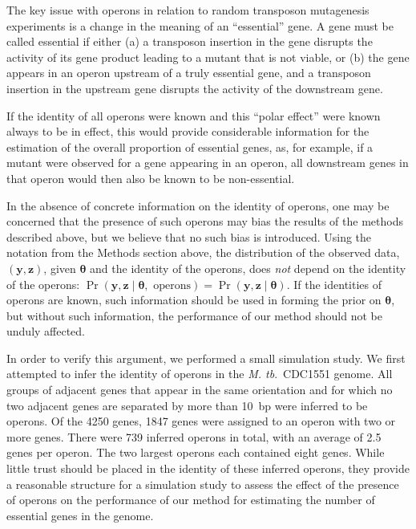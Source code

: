 \documentclass[letterpaper]{article}
\begin{document}
\begin{multicols}{2}
The key issue with operons in relation to random transposon
mutagenesis experiments is a change in the meaning of an ``essential''
gene.  A gene must be called essential if either (a) a transposon
insertion in the gene disrupts the activity of its gene product
leading to a mutant that is not viable, or (b) the gene appears in
an operon upstream of a truly essential gene, and a transposon
insertion in the upstream gene disrupts the activity of the
downstream gene. 

If the identity of all operons were known and this ``polar effect''
were known always to be in effect, this would provide considerable
information for the estimation of the overall proportion of essential
genes, as, for example, if a mutant were observed for a gene appearing
in an operon, all downstream genes in that operon would then also be
known to be non-essential.

In the absence of concrete information on the identity of operons, one
may be concerned that the presence of such operons may bias the
results of the methods described above, but we believe that no such
bias is introduced.  Using the notation from the Methods section
above, the distribution of the observed data, $(\boldsymbol{y},
\boldsymbol{z})$, given $\boldsymbol{\theta}$ and the identity of the
operons, does \emph{not} depend on the identity of the operons:
$\Pr(\boldsymbol{y}, \boldsymbol{z} \; | \; \boldsymbol{\theta},
\text{ operons}) = \Pr(\boldsymbol{y}, \boldsymbol{z} \; | \;
\boldsymbol{\theta})$.  If the identities of operons are known, such
information should be used in forming the prior on
$\boldsymbol{\theta}$, but without such information, the performance
of our method should not be unduly affected.

In order to verify this argument, we performed a small simulation
study.  We first attempted to infer the identity of operons in the
\emph{M. tb}.\ CDC1551 genome.  All groups of adjacent genes that
appear in the same orientation and for which no two adjacent genes are
separated by more than 10~bp were inferred to be operons.  Of the 4250
genes, 1847 genes were assigned to an operon with two or more genes.
There were 739 inferred operons in total, with an average of 2.5 genes
per operon.  The two largest operons each contained eight genes.
While little trust should be placed in the identity of these inferred
operons, they provide a reasonable structure for a simulation study to
assess the effect of the presence of operons on the performance of our
method for estimating the number of essential genes in the genome.


\end{multicols}
\end{document}

